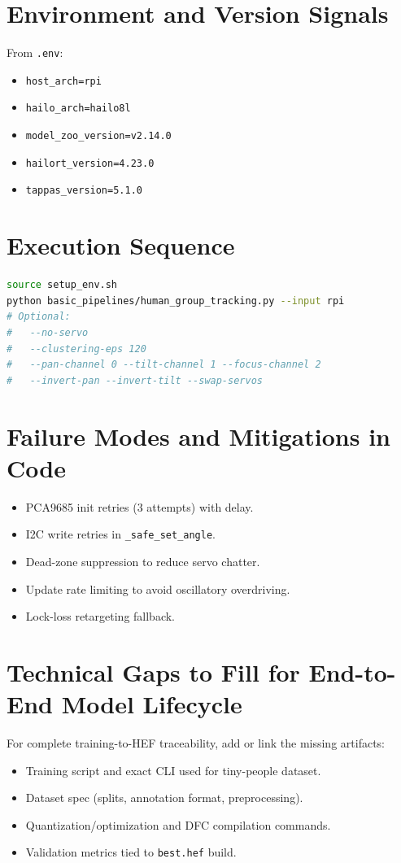 \documentclass[11pt,a4paper]{article}
\begin{document}
\section{Environment and Version Signals}
From \texttt{.env}:
\begin{itemize}[leftmargin=*]
  \item \texttt{host\_arch=rpi}
  \item \texttt{hailo\_arch=hailo8l}
  \item \texttt{model\_zoo\_version=v2.14.0}
  \item \texttt{hailort\_version=4.23.0}
  \item \texttt{tappas\_version=5.1.0}
\end{itemize}

\section{Execution Sequence}
\begin{lstlisting}[language=bash]
source setup_env.sh
python basic_pipelines/human_group_tracking.py --input rpi
# Optional:
#   --no-servo
#   --clustering-eps 120
#   --pan-channel 0 --tilt-channel 1 --focus-channel 2
#   --invert-pan --invert-tilt --swap-servos
\end{lstlisting}

\section{Failure Modes and Mitigations in Code}
\begin{itemize}[leftmargin=*]
  \item PCA9685 init retries (3 attempts) with delay.
  \item I2C write retries in \texttt{\_safe\_set\_angle}.
  \item Dead-zone suppression to reduce servo chatter.
  \item Update rate limiting to avoid oscillatory overdriving.
  \item Lock-loss retargeting fallback.
\end{itemize}

\section{Technical Gaps to Fill for End-to-End Model Lifecycle}
For complete training-to-HEF traceability, add or link the missing artifacts:
\begin{itemize}[leftmargin=*]
  \item Training script and exact CLI used for tiny-people dataset.
  \item Dataset spec (splits, annotation format, preprocessing).
  \item Quantization/optimization and DFC compilation commands.
  \item Validation metrics tied to \texttt{best.hef} build.
\end{itemize}
\end{document}
